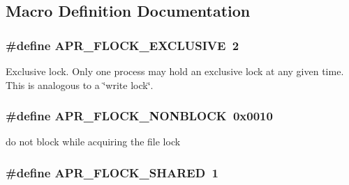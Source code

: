 \subsection{Macro Definition Documentation}
\hypertarget{group__apr__file__lock__types_gafbf0caa093b99bdf11e25360b9099852}{
\subsubsection[{A\-P\-R\-\_\-\-F\-L\-O\-C\-K\-\_\-\-E\-X\-C\-L\-U\-S\-I\-V\-E}]{\setlength{\rightskip}{0pt plus 5cm}\#define A\-P\-R\-\_\-\-F\-L\-O\-C\-K\-\_\-\-E\-X\-C\-L\-U\-S\-I\-V\-E~2}}\label{group__apr__file__lock__types_gafbf0caa093b99bdf11e25360b9099852}
Exclusive lock. Only one process may hold an exclusive lock at any given time. This is analogous to a \char`\"{}write lock\char`\"{}. \hypertarget{group__apr__file__lock__types_gab327fa0250e19006f20d5ec65fe7f22a}{
\subsubsection[{A\-P\-R\-\_\-\-F\-L\-O\-C\-K\-\_\-\-N\-O\-N\-B\-L\-O\-C\-K}]{\setlength{\rightskip}{0pt plus 5cm}\#define A\-P\-R\-\_\-\-F\-L\-O\-C\-K\-\_\-\-N\-O\-N\-B\-L\-O\-C\-K~0x0010}}\label{group__apr__file__lock__types_gab327fa0250e19006f20d5ec65fe7f22a}
do not block while acquiring the file lock \hypertarget{group__apr__file__lock__types_gaba177fe81cd70b389753ad2096b2ce7c}{
\subsubsection[{A\-P\-R\-\_\-\-F\-L\-O\-C\-K\-\_\-\-S\-H\-A\-R\-E\-D}]{\setlength{\rightskip}{0pt plus 5cm}\#define A\-P\-R\-\_\-\-F\-L\-O\-C\-K\-\_\-\-S\-H\-A\-R\-E\-D~1}}\label{group__apr__file__lock__types_gaba177fe81cd70b389753ad2096b2ce7c}
